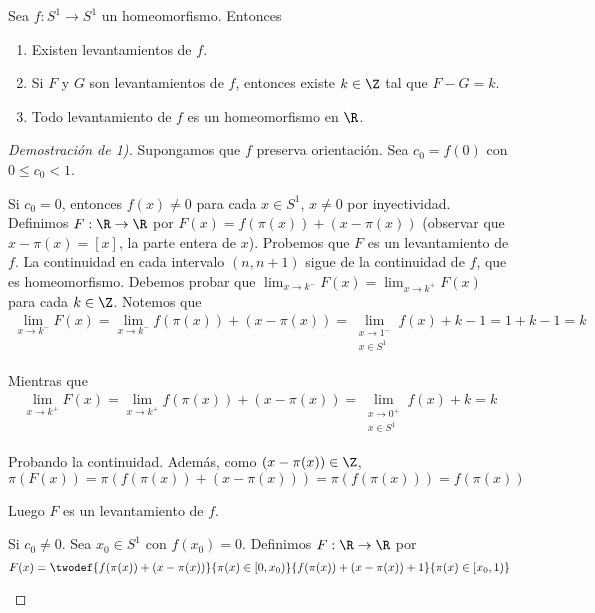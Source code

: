 \documentclass[	docname= Sistemas\ Din\'amicos,
				finished=1,
				semester=1,
				year=2017,
				professor=Godofredo\ Iommi,
				sigla=MAT2565]{apunte}
\begin{document}
\begin{prop} Sea $f: S^{1} \to S^{1}$ un homeomorfismo. Entonces
	\begin{enumerate}[\indent 1)]
		\item Existen levantamientos de $f$.
		\item Si $F$ y $G$ son levantamientos de $f$, entonces existe $k \in \Z$ tal que $F - G = k$.
		\item Todo levantamiento de $f$ es un homeomorfismo en $\R$.
	\end{enumerate}
\end{prop}

\begin{proof}[Demostración de 1)] Supongamos que $f$ preserva orientación. Sea $c_{0} = f(0)$ con $0 \leq c_{0} < 1$.
	\begin{casos}
		\item Si $c_{0} = 0$, entonces $f(x) \neq 0$ para cada $x \in S^{1}$, $x \neq 0$ por inyectividad. Definimos $F: \R \to \R$ por $F(x) = f(\pi(x)) + (x - \pi(x))$ (observar que $x - \pi(x) = [x]$, la parte entera de $x$). Probemos que $F$ es un levantamiento de $f$. La continuidad en cada intervalo $(n,n+1)$ sigue de la continuidad de $f$, que es homeomorfismo. Debemos probar que $\lim_{x \to k^{-}} F(x) = \lim_{x \to k^{+}} F(x)$ para cada $k \in \Z$. Notemos que
				\begin{align*}
					\lim_{x \to k^{-}} F(x)
						=	\lim_{x \to k^{-}} f(\pi(x)) + (x - \pi(x))
						=	\lim_{\substack{x \to 1^{-} \\ x \in S^{1}}} f(x) + k - 1
						=	1 + k - 1
						=	k
				\end{align*}
		
			Mientras que
				\begin{align*}
					\lim_{x \to k^{+}} F(x)
						=	\lim_{x \to k^{+}} f(\pi(x)) + (x - \pi(x))
						=	\lim_{\substack{x \to 0^{+} \\ x \in S^{1}}} f(x) + k
						=	k
				\end{align*}
		
			Probando la continuidad. Además, como $(x - \pi(x)) \in \Z$,
				$$\pi(F(x)) = \pi(f(\pi(x)) + (x-\pi(x))) = \pi(f(\pi(x))) = f(\pi(x))$$
		
			Luego $F$ es un levantamiento de $f$.
		
		\item Si $c_{0} \neq 0$. Sea $x_{0} \in S^{1}$ con $f(x_{0}) = 0$. Definimos $F: \R \to \R$ por
				$$F(x) = \twodef{f(\pi(x)) + (x - \pi(x))}{\pi(x) \in [0,x_{0})}
							{f(\pi(x)) + (x- \pi(x)) + 1}{\pi(x) \in [x_{0},1)}
				$$
			

\end{casos}
\end{proof}
\end{document}
